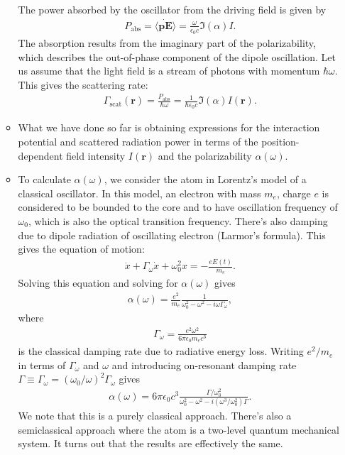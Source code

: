 \documentclass{report}
\theoremstyle{definition}
\begin{document}
\begin{itemize}
\begin{itemize}
		
		The power absorbed by the oscillator from the driving field is given by
		\begin{align}
		P_\text{abs} = \langle \dot{\textbf{p}\textbf{E}}  \rangle = \frac{\omega}{\epsilon_0 c}\Im(\alpha)I.
		\end{align}
		The absorption results from the imaginary part of the polarizability, which describes the out-of-phase component of the dipole oscillation. Let us assume that the light field is a stream of photons with momentum $\hbar \omega$. This gives the scattering rate:
		\begin{align}
		\Gamma_\text{scat}(\textbf{r}) = \frac{P_\text{abs}}{\hbar \omega} = \frac{1}{\hbar \epsilon_0 c}\Im(\alpha) I(\textbf{r}). 
		\end{align}
		
		\item What we have done so far is obtaining expressions for the interaction potential and scattered radiation power in terms of the position-dependent field intensity $I(\textbf{r})$ and the polarizability $\alpha(\omega)$. 
		
		\item To calculate $\alpha(\omega)$, we consider the atom in Lorentz's model of a classical oscillator. In this model, an electron with mass $m_e$, charge $e$ is considered to be bounded to the core and to have oscillation frequency of $\omega_0$, which is also the optical transition frequency. There's also damping due to dipole radiation of oscillating electron (Larmor's formula). This gives the equation of motion:
		\begin{align}
		\ddot{x} + \Gamma_\omega \dot{x} + \omega_0^2 x = -\frac{eE(t)}{m_e}.
		\end{align}
		Solving this equation and solving for $\alpha(\omega)$ gives
		\begin{align}
		\alpha(\omega) = \frac{e^2}{m_e}\frac{1}{\omega_0^2 - \omega^2 -i\omega \Gamma_\omega},
		\end{align}
		where
		\begin{align}
		\Gamma_\omega = \frac{e^2\omega^2}{6\pi \epsilon_0 m_e c^3}
		\end{align}
		is the classical damping rate due to radiative energy loss. Writing $e^2/m_e$ in terms of $\Gamma_\omega$ and $\omega$ and introducing on-resonant damping rate $\Gamma \equiv \Gamma_\omega = (\omega_0/\omega)^2 \Gamma_\omega$ gives
		\begin{align}
		\alpha(\omega) = 6\pi \epsilon_0 c^3 \frac{\Gamma/\omega_0^2}{\omega_0^2 - \omega^2 - i(\omega^3/\omega_0^2)\Gamma}.
		\end{align}
		We note that this is a purely classical approach. There's also a semiclassical approach where the atom is a two-level quantum mechanical system. It turns out that the results are effectively the same. 
		

\end{itemize}
\end{itemize}
\end{document}
